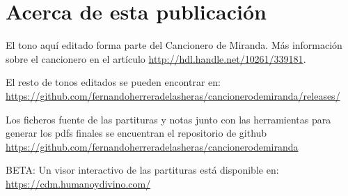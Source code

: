 
\section*{\centering\LARGE{Acerca de esta publicación}}

\vspace{0.5cm}




\vspace{0.5cm}

El tono aquí editado forma parte del Cancionero de Miranda. Más información sobre el cancionero en el artículo \url{http://hdl.handle.net/10261/339181}.

\vspace{0.5cm}

El resto de tonos editados se pueden encontrar en: \url{https://github.com/fernandoherreradelasheras/cancionerodemiranda/releases/}

\vspace{0.5cm}

Los ficheros fuente de las partituras y notas junto con las herramientas para generar los pdfs finales se encuentran el repositorio de github \url{https://github.com/fernandoherreradelasheras/cancionerodemiranda}

\vspace{0.5cm}

BETA: Un visor interactivo de las partituras está disponible en: \url{https://cdm.humanoydivino.com/} 




